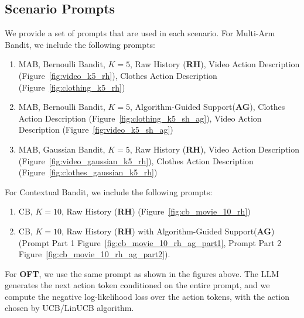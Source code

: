 \documentclass[11pt, logo]{googledeepmind}
\newcommand{\ag}{Algorithm-Guided Support\xspace}
\theoremstyle{plain}
\theoremstyle{definition}
\begin{document}
\subsection{Scenario Prompts}
\label{app_subsec: prompt}
We provide a set of prompts that are used in each scenario. For Multi-Arm Bandit, we include the following prompts:
\begin{enumerate}
    \item MAB, Bernoulli Bandit, $K=5$, Raw History (\textbf{RH}), Video Action Description (Figure~\ref{fig:video_k5_rh}), Clothes Action Description (Figure~\ref{fig:clothing_k5_rh})
    \item MAB, Bernoulli Bandit, $K=5$, \ag (\textbf{AG}), Clothes Action Description (Figure~\ref{fig:clothing_k5_sh_ag}), Video Action Description (Figure~\ref{fig:video_k5_sh_ag})
    \item MAB, Gaussian Bandit, $K=5$, Raw History (\textbf{RH}), Video Action Description (Figure~\ref{fig:video_gaussian_k5_rh}), Clothes Action Description (Figure~\ref{fig:clothes_gaussian_k5_rh})
\end{enumerate}
For Contextual Bandit, we include the following prompts:
\begin{enumerate}
    \item CB, $K=10$, Raw History (\textbf{RH}) (Figure~\ref{fig:cb_movie_10_rh})
    \item CB, $K=10$, Raw History (\textbf{RH}) with \ag (\textbf{AG}) (Prompt Part 1 Figure~\ref{fig:cb_movie_10_rh_ag_part1}, Prompt Part 2 Figure~\ref{fig:cb_movie_10_rh_ag_part2}).
\end{enumerate}
For \textbf{OFT}, we use the same prompt as shown in the figures above. The LLM generates the next action token conditioned on the entire prompt, and we compute the negative log-likelihood loss over the action tokens, with the action chosen by UCB/LinUCB algorithm.
\end{document}
